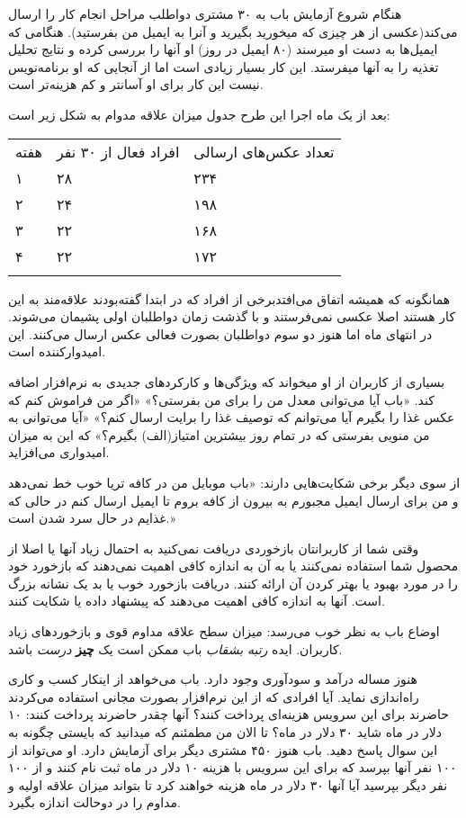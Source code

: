 هنگام شروع آزمایش باب به ۳۰ مشتری دواطلب مراحل انجام کار را ارسال
می‌کند(عکسی از هر چیزی که میخورید بگیرید و آنرا به ایمیل من بفرستید).
هنگامی که ایمیل‌ها به دست او میرسند (۸۰ ایمیل در روز) او آنها را بررسی
کرده و نتایج تحلیل تغذیه را به آنها میفرستد. این کار بسیار زیادی است اما
از آنجایی که او برنامه‌نویس نیست این کار برای او آسانتر و کم هزینه‌تر
است.

بعد از یک ماه اجرا این طرح جدول میزان علاقه مدوام به شکل زیر است:

\begin{longtable}[c]{@{}lll@{}}
\toprule\addlinespace
هفته & افراد فعال از ۳۰ نفر & تعداد عکس‌های ارسالی
\\\addlinespace
\midrule\endhead
۱ & ۲۸ & ۲۳۴
\\\addlinespace
۲ & ۲۴ & ۱۹۸
\\\addlinespace
۳ & ۲۲ & ۱۶۸
\\\addlinespace
۴ & ۲۲ & ۱۷۲
\\\addlinespace
\bottomrule
\end{longtable}

همانگونه که همیشه اتفاق می‌افتدبرخی از افراد که در ابتدا گفته‌بودند
علاقه‌مند به این کار هستند اصلا عکسی نمی‌فرستند و با گذشت زمان دواطلبان
اولی پشیمان می‌شوند. در انتهای ماه اما هنوز دو سوم دواطلبان بصورت فعالی
عکس ارسال می‌کنند. این امیدوارکننده است.

بسیاری از کاربران از او میخواند که ویژگی‌ها و کارکردهای جدیدی به
نرم‌افزار اضافه کند. «باب آیا می‌توانی معدل من را برای من بفرستی؟» «اگر
من فراموش کنم که عکس غذا را بگیرم آیا می‌توانم که توصیف غذا را برایت
ارسال کنم؟» «آیا می‌توانی به من منویی بفرستی که در تمام روز بیشترین
امتیاز(الف) بگیرم؟» که این به میزان امیدواری می‌افزاید.

از سوی دیگر برخی شکایت‌هایی دارند: «باب موبایل من در کافه تریا خوب خط
نمی‌دهد و من برای ارسال ایمیل مجبورم به بیرون از کافه بروم تا ایمیل
ارسال کنم در حالی که غذایم در حال سرد شدن است.»

وقتی شما از کاربرانتان بازخوردی دریافت نمی‌کنید به احتمال زیاد آنها یا
اصلا از محصول شما استفاده نمی‌کنند یا به آن به اندازه کافی اهمیت
نمی‌دهند که بازخورد خود را در مورد بهبود یا بهتر کردن آن ارائه کنند.
دریافت بازخورد خوب یا بد یک نشانه بزرگ است. آنها به اندازه کافی اهمیت‌
می‌دهند که پیشنهاد داده یا شکایت کنند.

اوضاع باب به نظر خوب می‌رسد: میزان سطح علاقه مداوم قوی و بازخوردهای زیاد
کاربران. ایده \emph{رتبه بشقاب} باب ممکن است یک \textbf{چیز} \emph{درست}
باشد.

هنوز مساله درآمد و سودآوری وجود دارد. باب می‌خواهد از اینکار کسب و کاری
راه‌اندازی نماید. آیا افرادی که از این نرم‌افزار بصورت مجانی استفاده
می‌کردند حاضرند برای این سرویس هزینه‌ای پرداخت کنند؟ آنها چقدر حاضرند
پرداخت کنند: ۱۰ دلار در ماه شاید ۳۰ دلار در ماه؟ تا الان من مطمئنم که
میدانید که بایستی چگونه به این سوال پاسخ دهید. باب هنوز ۴۵۰ مشتری دیگر
برای آزمایش دارد. او می‌تواند از ۱۰۰ نفر آنها بپرسد که برای این سرویس با
هزینه ۱۰ دلار در ماه ثبت نام کنند و از ۱۰۰ نفر دیگر بپرسید آیا آنها ۳۰
دلار در ماه هزینه خواهند کرد تا بتواند میزان علاقه اولیه و مداوم را در
دوحالت اندازه بگیرد.

